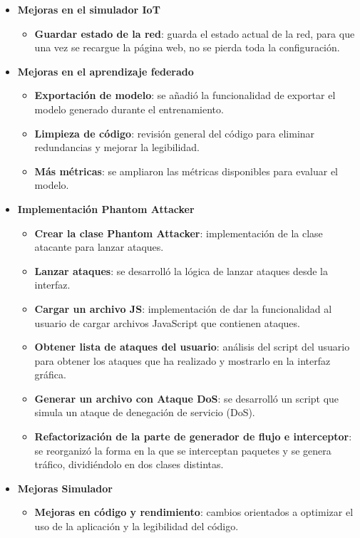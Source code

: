 \begin{itemize}
    \item \textbf{Mejoras en el simulador IoT}
    \begin{itemize}
        \item \textbf{Guardar estado de la red}: guarda el estado actual de la red, para que una vez se recargue la página web, no se pierda toda la configuración.
    \end{itemize}
    \item \textbf{Mejoras en el aprendizaje federado}
    \begin{itemize}
        \item \textbf{Exportación de modelo}: se añadió la funcionalidad de exportar el modelo generado durante el entrenamiento.
        \item \textbf{Limpieza de código}: revisión general del código para eliminar redundancias y mejorar la legibilidad.
        \item \textbf{Más métricas}: se ampliaron las métricas disponibles para evaluar el modelo.
    \end{itemize}
    \item \textbf{Implementación Phantom Attacker}
    \begin{itemize}
        \item \textbf{Crear la clase Phantom Attacker}: implementación de la clase atacante para lanzar ataques.
        \item \textbf{Lanzar ataques}: se desarrolló la lógica de lanzar ataques desde la interfaz.
        \item \textbf{Cargar un archivo JS}: implementación de dar la funcionalidad al usuario de cargar archivos JavaScript que contienen ataques.
        \item \textbf{Obtener lista de ataques del usuario}: análisis del script del usuario para obtener los ataques que ha realizado y mostrarlo en la interfaz gráfica.
        \item \textbf{Generar un archivo con Ataque DoS}: se desarrolló un script que simula un ataque de denegación de servicio (DoS).
        \item \textbf{Refactorización de la parte de generador de flujo e interceptor}: se reorganizó la forma en la que se interceptan paquetes y se genera tráfico, dividiéndolo en dos clases distintas.
    \end{itemize}
    \item \textbf{Mejoras Simulador}
    \begin{itemize}
        \item \textbf{Mejoras en código y rendimiento}: cambios orientados a optimizar el uso de la aplicación y la legibilidad del código.
    \end{itemize}
\end{itemize}

